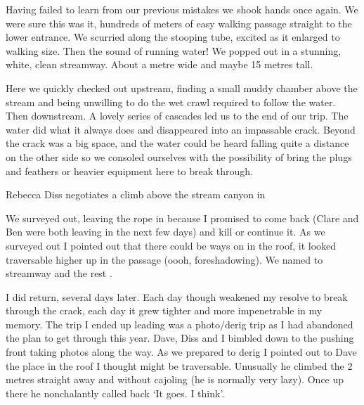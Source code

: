 Having failed to learn from our previous mistakes we shook hands once again. We were sure this was it, hundreds of meters of easy walking passage straight to the lower entrance. We scurried along the stooping tube, excited as it enlarged to walking size. Then the sound of running water! We popped out in a stunning, white, clean streamway. About a metre wide and maybe 15 metres tall.

Here we quickly checked out upstream, finding a small muddy chamber above the stream and being unwilling to do the wet crawl required to follow the water. Then downstream. A lovely series of cascades led us to the end of our trip. The water did what it always does and disappeared into an impassable crack. Beyond the crack was a big space, and the water could be heard falling quite a distance on the other side so we consoled ourselves with the possibility of bring the plugs and feathers or heavier equipment here to break through.

\begin{marginfigure}
\checkoddpage \ifoddpage \forcerectofloat \else \forceversofloat \fi
     \centering
        \caption{ Rebecca Diss negotiates a climb above the stream canyon in \protect{} } \label{Diss Hallelujah}
\end{marginfigure} 
 
We surveyed out, leaving the rope in because I promised to come back (Clare and Ben were both leaving in the next few days) and kill or continue it. As we surveyed out I pointed out that there could be ways on in the roof, it looked traversable higher up in the passage (oooh, foreshadowing). We named to streamway  and the rest .



\label{sec:sweet baby jesus}




I did return, several days later. Each day though weakened my resolve to break through the crack, each day it grew tighter and more impenetrable in my memory. The trip I ended up leading was a photo/derig trip as I had abandoned the plan to get through this year. Dave, Diss and I bimbled down to the pushing front taking photos along the way. As we prepared to derig I pointed out to Dave the place in the roof I thought might be traversable. Unusually he climbed the 2 metres straight away and without cajoling (he is normally very lazy). Once up there he nonchalantly called back `It goes. I think'.
 
